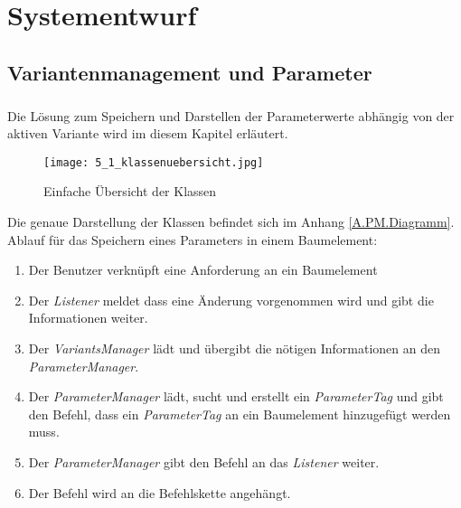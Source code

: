 \chapter{Systementwurf}\label{chp:systementwurf}


\section{Variantenmanagement und Parameter}
\paragraph{}

Die Lösung zum Speichern und Darstellen der Parameterwerte abhängig von der aktiven Variante wird im diesem Kapitel erläutert.\\

\begin{figure}[h!]
  \begin{center}
    \texttt{[image: 5\_1\_klassenuebersicht.jpg]}
  		  \caption{Einfache Übersicht der Klassen}
     \label{ttn.verbindung.klassen.loesung}
  \end{center}
\end{figure}


Die genaue Darstellung der Klassen befindet sich im Anhang  \ref{A.PM.Diagramm}. Ablauf für das Speichern eines Parameters in einem Baumelement:
\begin{enumerate}
\item Der Benutzer verknüpft eine Anforderung an ein Baumelement
\item Der \textit{Listener} meldet dass eine Änderung vorgenommen wird und gibt die Informationen weiter.
\item Der \textit{VariantsManager} lädt und übergibt die nötigen Informationen an den \textit{ParameterManager}.
\item Der \textit{ParameterManager} lädt, sucht und erstellt ein \textit{ParameterTag}  und gibt den Befehl, dass ein \textit{ParameterTag} an ein Baumelement hinzugefügt werden muss.
\item Der \textit{ParameterManager} gibt den Befehl an das \textit{Listener} weiter.
\item Der Befehl wird an die Befehlskette angehängt.
\end{enumerate}

